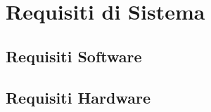 \section{Requisiti di Sistema}\label{Requisiti}

\subsection{Requisiti Software}\label{RS}

\subsection{Requisiti Hardware}\label{RH}